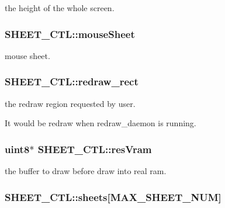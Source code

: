 the height of the whole screen. 

\hypertarget{struct_s_h_e_e_t___c_t_l_ac08483959e673b709053cab3add98122}{}
\subsubsection[{mouse\+Sheet}]{ S\+H\+E\+E\+T\+\_\+\+C\+T\+L\+::mouse\+Sheet}\label{struct_s_h_e_e_t___c_t_l_ac08483959e673b709053cab3add98122}


mouse sheet. 

\hypertarget{struct_s_h_e_e_t___c_t_l_a9bbc0e9f83ecc2809d2dda7128569161}{}
\subsubsection[{redraw\+\_\+rect}]{ S\+H\+E\+E\+T\+\_\+\+C\+T\+L\+::redraw\+\_\+rect}\label{struct_s_h_e_e_t___c_t_l_a9bbc0e9f83ecc2809d2dda7128569161}


the redraw region requested by user. 

It would be redraw when redraw\+\_\+daemon is running. \hypertarget{struct_s_h_e_e_t___c_t_l_a426b4ed9d4a90b8c1088b6985247dff8}{}
\subsubsection[{res\+Vram}]{\setlength{\rightskip}{0pt plus 5cm}uint8$\ast$ S\+H\+E\+E\+T\+\_\+\+C\+T\+L\+::res\+Vram}\label{struct_s_h_e_e_t___c_t_l_a426b4ed9d4a90b8c1088b6985247dff8}


the buffer to draw before draw into real ram. 

\hypertarget{struct_s_h_e_e_t___c_t_l_a2d2f4af17fdf61831f36efd2e0024698}{}
\subsubsection[{sheets}]{ S\+H\+E\+E\+T\+\_\+\+C\+T\+L\+::sheets\mbox{[}M\+A\+X\+\_\+\+S\+H\+E\+E\+T\+\_\+\+N\+U\+M\mbox{]}}\label{struct_s_h_e_e_t___c_t_l_a2d2f4af17fdf61831f36efd2e0024698}


